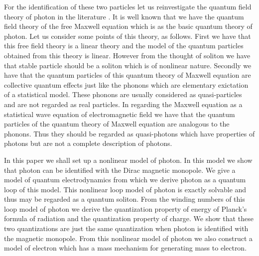 \documentclass[a4paper,a4paper]{article}
\begin{document}
For the identification of these two particles let us reinvestigate the quantum field theory of photon in the literature \cite{Zub}. It is well known that we have the quantum field theory of the free Maxwell equation which is as the basic quantum theory of photon. 
Let us consider some points of this theory, as follows. 
First we have that this  free field theory is a linear theory and the model of the quantum particles obtained from this theory is linear. However from the thought of soliton we have that stable particle should be a soliton which is of nonlinear nature. 
Secondly we have that  the quantum particles of  this  quantum theory of Maxwell equation are collective quantum effects just like the phonons which are elementary exictation of a statistical model. These phonons are usually considered as quasi-particles and are not regarded as real particles. In regarding the Maxwell equation as a statistical wave equation of electromagnetic field  we have that the quantum particles of the quantum  theory of Maxwell equation are analogous to the phonons. Thus they should be regarded as quasi-photons which have properties of photons but are not a complete description of photons. 




In this paper we shall set up a nonlinear model of photon. In this model we show that photon can be identified with the Dirac magnetic monopole. We give a model of quantum electrodynamics from which we derive photon as a quantum loop of this model. This nonlinear loop model of photon is exactly solvable and thus  may be regarded as a quantum soliton. From the winding numbers of this loop model of photon we derive the quantization property of energy of Planck's formula of radiation and the quantization property of charge. We show that these two quantizations are just the same quantization when photon is identified with the magnetic monopole. From this nonlinear model of photon we also construct a model of electron which has a mass mechanism for generating mass to electron.
\end{document}

